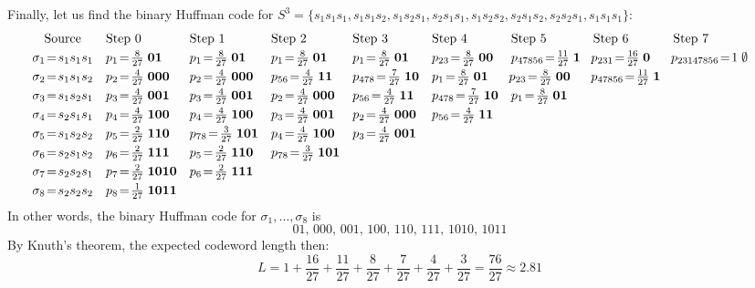 \documentclass[11pt]{article}
\begin{document}
Finally,
let us find the binary Huffman code for $S^3 = \{s_1s_1s_1,s_1s_1s_2,s_1s_2s_1,s_2s_1s_1,s_1s_2s_2,s_2s_1s_2,s_2s_2s_1,s_1s_1s_1\}$:
{\scriptsize\[\hspace*{-5mm}\begin{array}{cllllllll}
  \text{Source}              & \text{Step 0}                          & \text{Step 1}                            & \text{Step 2}                            & \text{Step 3}                            & \text{Step 4}                           & \text{Step 5}                                & \text{Step 6}                           & \text{Step 7}\\[1mm]
    \sigma_1 \!=\! s_1s_1s_1 & p_1 \!=\! \frac{8}{27}\;\mathbf{  01} & p_1    \!=\! \frac{8}{27}\;\mathbf{ 01} & p_1    \!=\! \frac{8}{27}\;\mathbf{ 01} & p_1     \!=\! \frac{8}{27}\;\mathbf{ 01} & p_{23}  \!=\! \frac{8}{27}\;\mathbf{00} &   p_{47856} \!=\! \frac{11}{27}\;\mathbf{ 1} & \!p_{231}   \!=\! \frac{16}{27}\;\mathbf{0} & \!p_{23147856} \!=\! 1\;\mathbf{\emptyset}\\[1mm]
    \sigma_2 \!=\! s_1s_1s_2 & p_2 \!=\! \frac{4}{27}\;\mathbf{ 000} & p_2    \!=\! \frac{4}{27}\;\mathbf{000} & p_{56} \!=\! \frac{4}{27}\;\mathbf{ 11} & p_{478} \!=\! \frac{7}{27}\;\mathbf{ 10} & p_1     \!=\! \frac{8}{27}\;\mathbf{01} & \!p_{23}    \!=\! \frac{ 8}{27}\;\mathbf{00} & \!p_{47856} \!=\! \frac{11}{27}\;\mathbf{1}\\[1mm]
    \sigma_3 \!=\! s_1s_2s_1 & p_3 \!=\! \frac{4}{27}\;\mathbf{ 001} & p_3    \!=\! \frac{4}{27}\;\mathbf{001} & p_2    \!=\! \frac{4}{27}\;\mathbf{000} & p_{56}  \!=\! \frac{4}{27}\;\mathbf{ 11} & p_{478} \!=\! \frac{7}{27}\;\mathbf{10} &   p_1       \!=\! \frac{ 8}{27}\;\mathbf{01}\\[1mm]
    \sigma_4 \!=\! s_2s_1s_1 & p_4 \!=\! \frac{4}{27}\;\mathbf{ 100} & p_4    \!=\! \frac{4}{27}\;\mathbf{100} & p_3    \!=\! \frac{4}{27}\;\mathbf{001} & p_2     \!=\! \frac{4}{27}\;\mathbf{000} & p_{56}  \!=\! \frac{4}{27}\;\mathbf{11}\\[1mm]
    \sigma_5 \!=\! s_1s_2s_2 & p_5 \!=\! \frac{2}{27}\;\mathbf{ 110} & p_{78} \!=\! \frac{3}{27}\;\mathbf{101} & p_4    \!=\! \frac{4}{27}\;\mathbf{100} & p_3     \!=\! \frac{4}{27}\;\mathbf{001}\\[1mm]
    \sigma_6 \!=\! s_2s_1s_2 & p_6 \!=\! \frac{2}{27}\;\mathbf{ 111} & p_5    \!=\! \frac{2}{27}\;\mathbf{110} & p_{78} \!=\! \frac{3}{27}\;\mathbf{101}\\[1mm]
    \sigma_7 \!=\! s_2s_2s_1 & p_7 \!=\! \frac{2}{27}\;\mathbf{1010} & p_6    \!=\! \frac{2}{27}\;\mathbf{111}\\[1mm]
    \sigma_8 \!=\! s_2s_2s_2 & p_8 \!=\! \frac{1}{27}\;\mathbf{1011}
\end{array}\]}
In other words, the binary Huffman code for $\sigma_1,\dots,\sigma_8$ is
\[
  01,\, 000,\, 001,\, 100,\, 110,\, 111,\, 1010,\, 1011
\]
By Knuth's theorem, the expected codeword length then:
     \[
       L = 1
         + \frac{16}{27}
         + \frac{11}{27}
         + \frac{ 8}{27}
         + \frac{ 7}{27}
         + \frac{ 4}{27}
         + \frac{ 3}{27}
         = \frac{76}{27}
         \approx 2.81 \]
\end{document}
